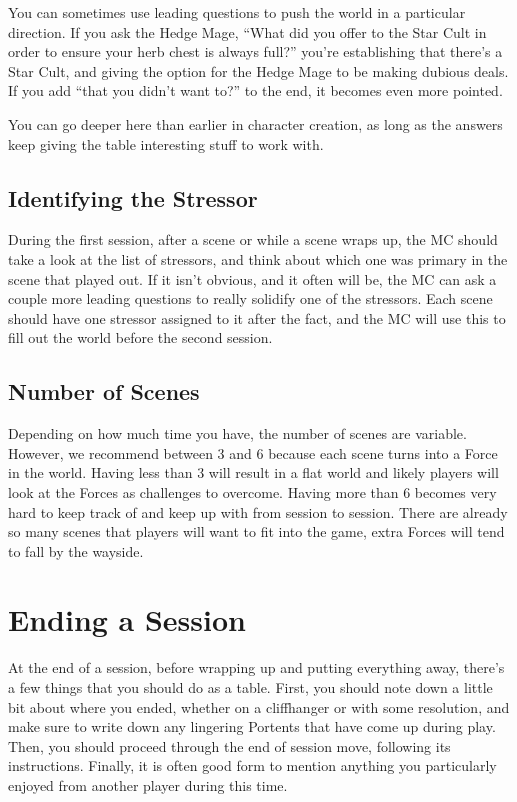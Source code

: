 \documentclass[
  oneside,
  statementpaper,
  9pt]{memoir}
\begin{document}
You can sometimes use leading questions to push the world in a
particular direction. If you ask the Hedge Mage, ``What did you offer to
the Star Cult in order to ensure your herb chest is always full?''
you're establishing that there's a Star Cult, and giving the option for
the Hedge Mage to be making dubious deals. If you add ``that you didn't
want to?'' to the end, it becomes even more pointed.

You can go deeper here than earlier in character creation, as long as
the answers keep giving the table interesting stuff to work with.

\hypertarget{identifying-the-stressor}{%
\subsection{Identifying the Stressor}\label{identifying-the-stressor}}

During the first session, after a scene or while a scene wraps up, the
MC should take a look at the list of stressors, and think about which
one was primary in the scene that played out. If it isn't obvious, and
it often will be, the MC can ask a couple more leading questions to
really solidify one of the stressors. Each scene should have one
stressor assigned to it after the fact, and the MC will use this to fill
out the world before the second session.

\hypertarget{number-of-scenes}{%
\subsection{Number of Scenes}\label{number-of-scenes}}

Depending on how much time you have, the number of scenes are variable.
However, we recommend between 3 and 6 because each scene turns into a
Force in the world. Having less than 3 will result in a flat world and
likely players will look at the Forces as challenges to overcome. Having
more than 6 becomes very hard to keep track of and keep up with from
session to session. There are already so many scenes that players will
want to fit into the game, extra Forces will tend to fall by the
wayside.

\hypertarget{ending-a-session-1}{%
\section{Ending a Session}\label{ending-a-session-1}}

At the end of a session, before wrapping up and putting everything away,
there's a few things that you should do as a table. First, you should
note down a little bit about where you ended, whether on a cliffhanger
or with some resolution, and make sure to write down any lingering
Portents that have come up during play. Then, you should proceed through
the end of session move, following its instructions. Finally, it is
often good form to mention anything you particularly enjoyed from
another player during this time.
\end{document}
